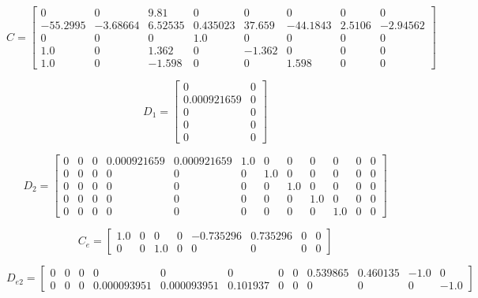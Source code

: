 \documentclass[]{report}
\begin{document}
\[
C =
\begin{bmatrix}
	0 & 0 & 9.81 & 0 & 0 & 0 & 0 & 0 \\
	-55.2995 & -3.68664 & 6.52535 & 0.435023 & 37.659 & -44.1843 & 2.5106 & -2.94562 \\
	0 & 0 & 0 & 1.0 & 0 & 0 & 0 & 0 \\
	1.0 & 0 & 1.362 & 0 & -1.362 & 0 & 0 & 0 \\
	1.0 & 0 & -1.598 & 0 & 0 & 1.598 & 0 & 0
\end{bmatrix}
\]
\hspace{-1.8cm}
\begin{minipage}{0.45\textwidth}
	\[
	D_1 =
	\begin{bmatrix}
		0 & 0 \\
		0.000921659 & 0 \\
		0 & 0 \\
		0 & 0 \\
		0 & 0
	\end{bmatrix}
	\]
\end{minipage}
\noindent
\hspace{-1cm}
\begin{minipage}{0.45\textwidth}
\[
D_2 =
\left[
\begin{array}{cccccccccccc}
	0 & 0 & 0 & 0.000921659 & 0.000921659 & 1.0 & 0 & 0 & 0 & 0 & 0 & 0 \\
	0 & 0 & 0 & 0           & 0           & 0   & 1.0 & 0 & 0 & 0 & 0 & 0 \\
	0 & 0 & 0 & 0           & 0           & 0   & 0   & 1.0 & 0 & 0 & 0 & 0 \\
	0 & 0 & 0 & 0           & 0           & 0   & 0   & 0   & 1.0 & 0 & 0 & 0 \\
	0 & 0 & 0 & 0           & 0           & 0   & 0   & 0   & 0   & 1.0 & 0 & 0
\end{array}
\right]
\]

\end{minipage}
\vspace{0.4cm}
	\[
	C_e =
	\begin{bmatrix}
		1.0 & 0 & 0 & 0 & -0.735296 & 0.735296 & 0 & 0 \\
		0 & 0 & 1.0 & 0 & 0 & 0 & 0 & 0
	\end{bmatrix}
	\]

\hspace{-1.7cm}
\begin{minipage}{0.45\textwidth}
\[
D_{e2} =
\left[
\begin{array}{cccccccccccc}
	0 & 0 & 0 & 0 & 0 & 0 & 0 & 0 & 0.539865 & 0.460135 & -1.0 & 0 \\
	0 & 0 & 0 & 0.000093951 & 0.000093951 & 0.101937 & 0 & 0 & 0 & 0 & 0 & -1.0
\end{array}
\right]
\]

\end{minipage}
\end{document}
